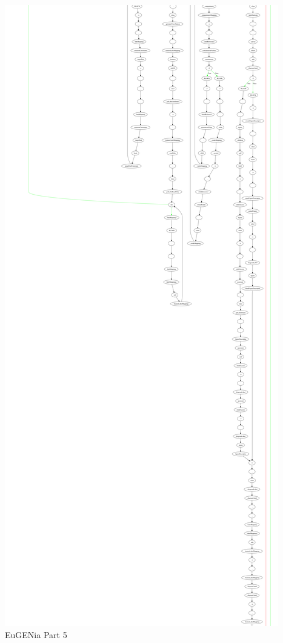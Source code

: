 \begin{minipage}[b]{\textwidth}
\centering
\includegraphics[height=0.97\textheight]{./figures/eug_5.png}
EuGENia Part 5
\end{minipage}
